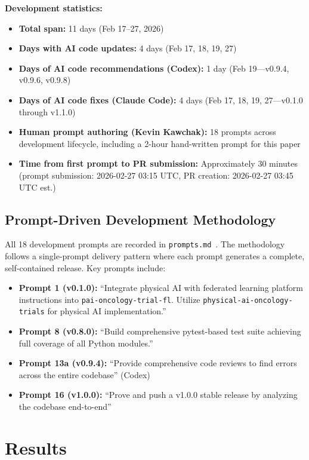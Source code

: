 \documentclass[10pt]{article}
\begin{document}
\textbf{Development statistics:}
\begin{itemize}
  \item \textbf{Total span:} 11 days (Feb 17--27, 2026)
  \item \textbf{Days with AI code updates:} 4 days (Feb 17, 18, 19, 27)
  \item \textbf{Days of AI code recommendations (Codex):} 1 day (Feb 19---v0.9.4, v0.9.6, v0.9.8)
  \item \textbf{Days of AI code fixes (Claude Code):} 4 days (Feb 17, 18, 19, 27---v0.1.0 through v1.1.0)
  \item \textbf{Human prompt authoring (Kevin Kawchak):} 18 prompts across development lifecycle, including a 2-hour hand-written prompt for this paper
  \item \textbf{Time from first prompt to PR submission:} Approximately 30 minutes (prompt submission: 2026-02-27 03:15 UTC, PR creation: 2026-02-27 03:45 UTC est.)
\end{itemize}

\subsection{Prompt-Driven Development Methodology}

All 18 development prompts are recorded in \texttt{prompts.md}~\cite{kawchak2026fl}. The methodology follows a single-prompt delivery pattern where each prompt generates a complete, self-contained release. Key prompts include:
\begin{itemize}
  \item \textbf{Prompt 1 (v0.1.0):} ``Integrate physical AI with federated learning platform instructions into \texttt{pai-oncology-trial-fl}. Utilize \texttt{physical-ai-oncology-trials} for physical AI implementation.''
  \item \textbf{Prompt 8 (v0.8.0):} ``Build comprehensive pytest-based test suite achieving full coverage of all Python modules.''
  \item \textbf{Prompt 13a (v0.9.4):} ``Provide comprehensive code reviews to find errors across the entire codebase'' (Codex)
  \item \textbf{Prompt 16 (v1.0.0):} ``Prove and push a v1.0.0 stable release by analyzing the codebase end-to-end''
\end{itemize}

\section{Results}
\label{sec:results}
\end{document}
